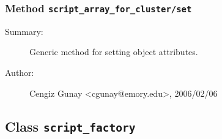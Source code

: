 \subsubsection[Method \texttt{set}]{Method \texttt{script\_array\_for\_cluster/set}}%
%
\label{ref_script_array_for_cluster__set}%
\hypertarget{ref_script_array_for_cluster__set}{}%
\begin{description}
\item[Summary:]Generic method for setting object attributes.
%
%
%
%
%
%
%
\item[Author:]%
Cengiz Gunay <cgunay@emory.edu>, 2006/02/06%
\end{description}
\methodline%
\subsection{Class \texttt{script\_factory}}%
%
\label{ref_script_factory}%
\hypertarget{ref_script_factory}{}%
